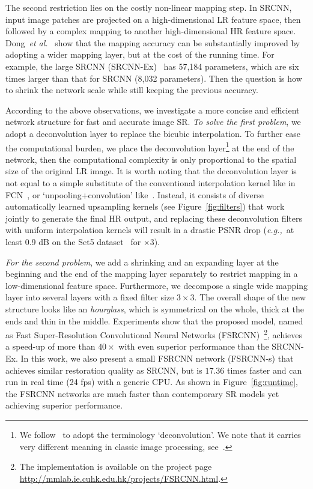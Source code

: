 \documentclass[runningheads]{llncs}
\newcommand{\etal}{\emph{et al.}}
\newcommand{\eg}{\emph{e.g.,}}
\begin{document}
The second restriction lies on the costly non-linear mapping step. In SRCNN, input image patches are projected on a high-dimensional LR feature space, then followed by a complex mapping to another high-dimensional HR feature space. Dong~\etal~\cite{Dong2015} show that the mapping accuracy can be substantially improved by adopting a wider mapping layer, but at the cost of the running time. For example, the large SRCNN (SRCNN-Ex)~\cite{Dong2015} has 57,184 parameters, which are six times larger than that for SRCNN (8,032 parameters). Then the question is how to shrink the network scale while still keeping the previous accuracy.

According to the above observations, we investigate a more concise and efficient network structure for fast and accurate image SR.
\textit{To solve the first problem}, we adopt a deconvolution layer to replace the bicubic interpolation. To further ease the computational burden, we place the deconvolution layer\footnote{We follow~\cite{Zeiler2014} to adopt the terminology `deconvolution'. We note that it carries very different meaning in classic image processing, see~\cite{xu2014deep}.} at the end of the network, then the computational complexity is only proportional to the spatial size of the original LR image. It is worth noting that the deconvolution layer is not equal to a simple substitute of the conventional interpolation kernel like in FCN~\cite{Long2015}, or `unpooling+convolution' like~\cite{dosovitskiy2015learning}. Instead, it consists of diverse automatically learned upsampling kernels (see Figure~\ref{fig:filters}) that work jointly to generate the final HR output, and replacing these deconvolution filters with uniform interpolation kernels will result in a drastic PSNR drop (\eg~at least 0.9 dB on the Set5 dataset~\cite{Bevilacqua2012} for $\times 3$).

\textit{For the second problem}, we add a shrinking and an expanding layer at the beginning and the end of the mapping layer separately to restrict mapping in a low-dimensional feature space. Furthermore, we decompose a single wide mapping layer into several layers with a fixed filter size $3\times 3$. The overall shape of the new structure looks like an \textit{hourglass}, which is symmetrical on the whole, thick at the ends and thin in the middle. Experiments show that the proposed model, named as Fast Super-Resolution Convolutional Neural Networks (FSRCNN)~\footnote{The implementation is available on the project page \url{http://mmlab.ie.cuhk.edu.hk/projects/FSRCNN.html}.}, achieves a speed-up of more than $40\times$ with even superior performance than the SRCNN-Ex. In this work, we also present a small FSRCNN network (FSRCNN-s) that achieves similar restoration quality as SRCNN, but is $17.36$ times faster and can run in real time (24 fps) with a generic CPU.
As shown in Figure~\ref{fig:runtime}, the FSRCNN networks are much faster than contemporary SR models yet achieving superior performance.
\end{document}
